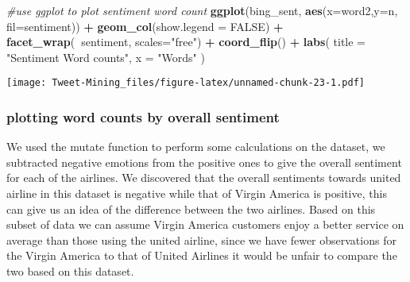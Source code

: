 \documentclass[
]{article}
\newenvironment{Shaded}{\begin{snugshade}}{\end{snugshade}}
\newcommand{\CommentTok}[1]{\textcolor[rgb]{0.56,0.35,0.01}{\textit{#1}}}
\newcommand{\DataTypeTok}[1]{\textcolor[rgb]{0.13,0.29,0.53}{#1}}
\newcommand{\KeywordTok}[1]{\textcolor[rgb]{0.13,0.29,0.53}{\textbf{#1}}}
\newcommand{\NormalTok}[1]{#1}
\newcommand{\OperatorTok}[1]{\textcolor[rgb]{0.81,0.36,0.00}{\textbf{#1}}}
\newcommand{\OtherTok}[1]{\textcolor[rgb]{0.56,0.35,0.01}{#1}}
\newcommand{\StringTok}[1]{\textcolor[rgb]{0.31,0.60,0.02}{#1}}
\begin{document}
\begin{Shaded}
\begin{Highlighting}[]
   \CommentTok{#use ggplot to plot sentiment word count}
    \KeywordTok{ggplot}\NormalTok{(bing_sent, }\KeywordTok{aes}\NormalTok{(}\DataTypeTok{x=}\NormalTok{word2,}\DataTypeTok{y=}\NormalTok{n, }\DataTypeTok{fil=}\NormalTok{sentiment)) }\OperatorTok{+}
\StringTok{    }\KeywordTok{geom_col}\NormalTok{(}\DataTypeTok{show.legend =} \OtherTok{FALSE}\NormalTok{) }\OperatorTok{+}
\StringTok{    }\KeywordTok{facet_wrap}\NormalTok{(}\OperatorTok{~}\NormalTok{sentiment, }\DataTypeTok{scales=}\StringTok{"free"}\NormalTok{) }\OperatorTok{+}
\StringTok{    }\KeywordTok{coord_flip}\NormalTok{() }\OperatorTok{+}\StringTok{ }
\StringTok{    }\KeywordTok{labs}\NormalTok{(}
      \DataTypeTok{title =} \StringTok{"Sentiment Word counts"}\NormalTok{,}
      \DataTypeTok{x =} \StringTok{"Words"}
\NormalTok{    )}
\end{Highlighting}
\end{Shaded}

\texttt{[image: Tweet-Mining\_files/figure-latex/unnamed-chunk-23-1.pdf]}

\hypertarget{plotting-word-counts-by-overall-sentiment}{%
\subsubsection{plotting word counts by overall
sentiment}\label{plotting-word-counts-by-overall-sentiment}}

We used the mutate function to perform some calculations on the dataset,
we subtracted negative emotions from the positive ones to give the
overall sentiment for each of the airlines. We discovered that the
overall sentiments towards united airline in this dataset is negative
while that of Virgin America is positive, this can give us an idea of
the difference between the two airlines. Based on this subset of data we
can assume Virgin America customers enjoy a better service on average
than those using the united airline, since we have fewer observations
for the Virgin America to that of United Airlines it would be unfair to
compare the two based on this dataset.

\begin{Shaded}
\end{Shaded}
\end{document}
